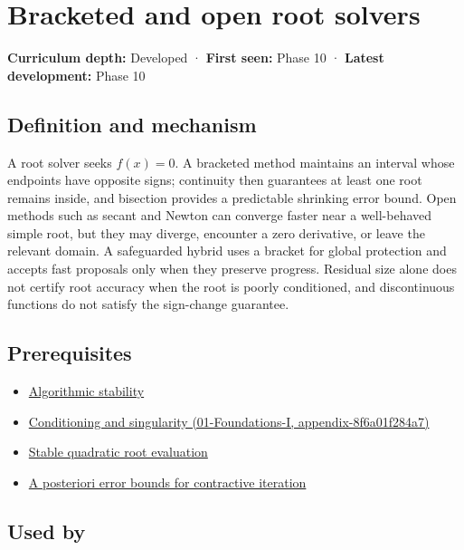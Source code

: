 \hypertarget{appendix-f63eb850796d}{}
\section{Bracketed and open root solvers}\label{appendix-f63eb850796d-bracketed-and-open-root-solvers}

\textbf{Curriculum depth:} Developed · \textbf{First seen:} Phase 10 · \textbf{Latest development:} Phase 10

\subsection{Definition and mechanism}\label{appendix-f63eb850796d-definition-and-mechanism}

A root solver seeks \(f(x)=0\). A bracketed method maintains an interval whose endpoints have opposite signs; continuity then guarantees at least one root remains inside, and bisection provides a predictable shrinking error bound. Open methods such as secant and Newton can converge faster near a well-behaved simple root, but they may diverge, encounter a zero derivative, or leave the relevant domain. A safeguarded hybrid uses a bracket for global protection and accepts fast proposals only when they preserve progress. Residual size alone does not certify root accuracy when the root is poorly conditioned, and discontinuous functions do not satisfy the sign-change guarantee.

\subsection{Prerequisites}\label{appendix-f63eb850796d-prerequisites}

\begin{itemize}
\tightlist
\item
  \hyperref[appendix-aa2bf0d79639]{Algorithmic stability}
\item
  \href{../01-Foundations-I/main.pdf\#nameddest=appendix-8f6a01f284a7}{Conditioning and singularity (01-Foundations-I, appendix-8f6a01f284a7)}
\item
  \hyperref[appendix-b9afba7f63e5]{Stable quadratic root evaluation}
\item
  \hyperref[appendix-d83b0ad1be7f]{A posteriori error bounds for contractive iteration}
\end{itemize}

\subsection{Used by}\label{appendix-f63eb850796d-used-by}

